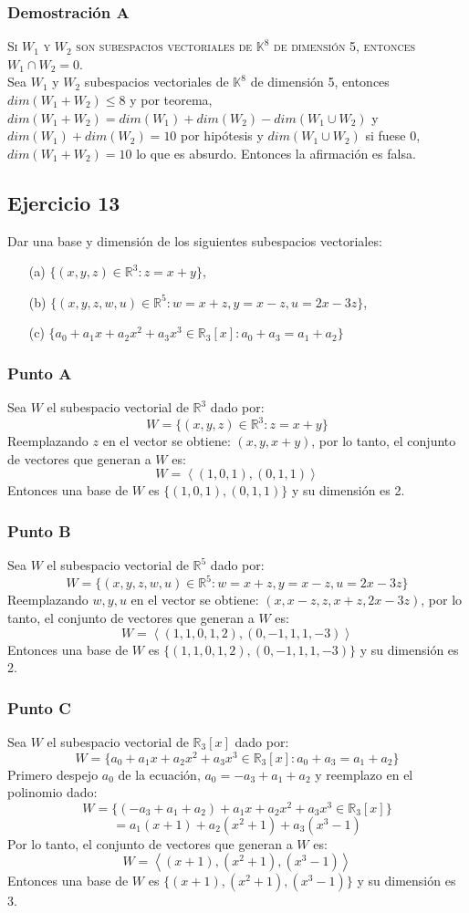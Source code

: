 \documentclass[a4paper,12pt]{article}
\begin{document}
\subsubsection{Demostración A}
\textsc{Si $W_1$ y $W_2$ son subespacios vectoriales de $\mathbb{K}^8$ de dimensión 5, entonces $W_1\cap W_2=0$.} \\
Sea $W_1$ y $W_2$ subespacios vectoriales de $\mathbb{K}^8$ de dimensión 5, entonces $dim(W_1+W_2)\leq 8$ y por teorema, $dim (W_1+W_2)= dim(W_1)+ dim (W_2) - dim(W_1 \cup W_2)$
y $dim(W_1)+dim(W_2)=10$ por hipótesis y $dim(W_1 \cup W_2)$ si fuese 0, $dim(W_1+W_2)=10$ lo que es absurdo. Entonces la afirmación es falsa. 
\subsection{Ejercicio 13}
Dar una base y dimensión de los siguientes subespacios vectoriales:
\begin{itemize}
    \item[(a)] $\{ (x,y,z)\in\mathds{R}^3 : z=x+y \}$,
    \item[(b)] $\{ (x,y,z,w,u)\in\mathds{R}^5:w=x+z, y=x-z, u=2x-3z \}$,
    \item[(c)] $\{ a_0+a_1x+a_2x^2+a_3x^3 \in\mathds{R}_3[x]:a_0+a_3=a_1+a_2 \}$
\end{itemize}
\subsubsection{Punto A}
Sea $W$ el subespacio vectorial de $\mathds{R}^3$ dado por:
$$
W=\{ (x,y,z)\in\mathds{R}^3 : z=x+y \}
$$
Reemplazando $z$ en el vector se obtiene: $(x,y,x+y)$, por lo tanto, el conjunto de vectores que generan a $W$ es:
$$
W=\left \langle (1,0,1), (0,1,1) \right \rangle
$$
Entonces una base de $W$ es $\{(1,0,1), (0,1,1)\}$ y su dimensión es 2.
\subsubsection{Punto B}
Sea $W$ el subespacio vectorial de $\mathds{R}^5$ dado por:
$$
W=\{ (x,y,z,w,u)\in\mathds{R}^5:w=x+z, y=x-z, u=2x-3z \}
$$
Reemplazando $w,y,u$ en el vector se obtiene: $(x,x-z,z,x+z,2x-3z)$, por lo tanto, el conjunto de vectores que generan a $W$ es:
$$
W=\left \langle (1,1,0,1,2), (0,-1,1,1,-3) \right \rangle
$$
Entonces una base de $W$ es $\{(1,1,0,1,2), (0,-1,1,1,-3)\}$ y su dimensión es 2.
\subsubsection{Punto C}
Sea $W$ el subespacio vectorial de $\mathds{R}_3[x]$ dado por:
$$
W=\{ a_0+a_1x+a_2x^2+a_3x^3 \in\mathds{R}_3[x]:a_0+a_3=a_1+a_2 \}
$$
Primero despejo $a_0$ de la ecuación, $a_0=-a_3+a_1+a_2$ y reemplazo en el polinomio dado:
$$
W=\{ (-a_3+a_1+a_2)+a_1x+a_2x^2+a_3x^3 \in\mathds{R}_3[x] \}
$$
$$
=a_1(x+1)+a_2(x^2+1)+a_3(x^3-1)
$$
Por lo tanto, el conjunto de vectores que generan a $W$ es:
$$
W=\left \langle (x+1),(x^2+1),(x^3-1) \right \rangle
$$
Entonces una base de $W$ es $\{(x+1),(x^2+1),(x^3-1)\}$ y su dimensión es 3.
\end{document}
